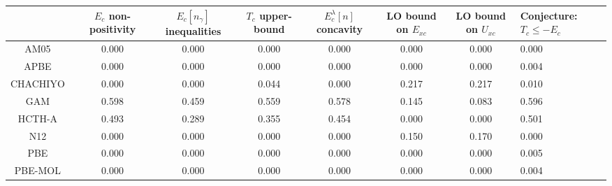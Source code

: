 \begin{tabular}{|c|c|c|c|c|c|c|l|}
\hline
                                                                  & $E_c$ non-positivity & $E_c[n_{\gamma}]$ inequalities & $T_c$ upper-bound & $E^{\lambda}_c[n]$ concavity & LO bound on $E_{xc}$ & LO bound on $U_{xc}$ & Conjecture: $T_c \leq -E_c$ \\ \hline
              AM05~\cite{Armiento2005_085108,Mattsson2008_084714} &                0.000 &                          0.000 &             0.000 &                        0.000 &                0.000 &                0.000 &                       0.000 \\ \hline
                                APBE~\cite{Constantin2011_186406} &                0.000 &                          0.000 &             0.000 &                        0.000 &                0.000 &                0.000 &                       0.004 \\ \hline
                              CHACHIYO~\cite{Chachiyo2020_112669} &                0.000 &                          0.000 &             0.044 &                        0.000 &                0.217 &                0.217 &                       0.010 \\ \hline
                                          GAM~\cite{Yu2015_12146} &                0.598 &                          0.459 &             0.559 &                        0.578 &                0.145 &                0.083 &                       0.596 \\ \hline
                                 HCTH-A~\cite{Hamprecht1998_6264} &                0.493 &                          0.289 &             0.355 &                        0.454 &                0.000 &                0.000 &                       0.501 \\ \hline
                                     N12~\cite{Peverati2012_2310} &                0.000 &                          0.000 &             0.000 &                        0.000 &                0.150 &                0.170 &                       0.000 \\ \hline
                   PBE~\cite{Perdew1996_3865,Perdew1996_3865_err} &                0.000 &                          0.000 &             0.000 &                        0.000 &                0.000 &                0.000 &                       0.005 \\ \hline
                               PBE-MOL~\cite{delCampo2012_104108} &                0.000 &                          0.000 &             0.000 &                        0.000 &                0.000 &                0.000 &                       0.004 \\ \hline

\end{tabular}
